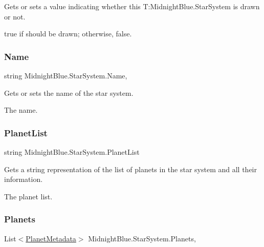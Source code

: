 Gets or sets a value indicating whether this T\+:\+Midnight\+Blue.\+Star\+System is drawn or not. 

{\ttfamily true} if should be drawn; otherwise, {\ttfamily false}.\hypertarget{class_midnight_blue_1_1_star_system_a63adfd0ef7d74bb7d5f224bb2df75aa5}{}\label{class_midnight_blue_1_1_star_system_a63adfd0ef7d74bb7d5f224bb2df75aa5} 
\subsubsection{\texorpdfstring{Name}{Name}}
{\footnotesize\ttfamily string Midnight\+Blue.\+Star\+System.\+Name\hspace{0.3cm}{\ttfamily [get]}, {\ttfamily [set]}}



Gets or sets the name of the star system. 

The name.\hypertarget{class_midnight_blue_1_1_star_system_af74f3d59d7010d0d0a57549f7bbd2639}{}\label{class_midnight_blue_1_1_star_system_af74f3d59d7010d0d0a57549f7bbd2639} 
\subsubsection{\texorpdfstring{Planet\+List}{PlanetList}}
{\footnotesize\ttfamily string Midnight\+Blue.\+Star\+System.\+Planet\+List\hspace{0.3cm}{\ttfamily [get]}}



Gets a string representation of the list of planets in the star system and all their information. 

The planet list.\hypertarget{class_midnight_blue_1_1_star_system_a041dfe27c393065732ea841516388c50}{}\label{class_midnight_blue_1_1_star_system_a041dfe27c393065732ea841516388c50} 
\subsubsection{\texorpdfstring{Planets}{Planets}}
{\footnotesize\ttfamily List$<$\hyperlink{class_midnight_blue_1_1_planet_metadata}{Planet\+Metadata}$>$ Midnight\+Blue.\+Star\+System.\+Planets\hspace{0.3cm}{\ttfamily [get]}, {\ttfamily [set]}}



